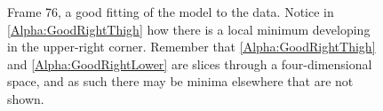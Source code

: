\begin{figure}[p]
	\caption{Frame 76, a good fitting of the model to the data.
		Notice in \ref{Alpha:GoodRightThigh} how there is a local minimum developing in the upper-right corner.
		Remember that \ref{Alpha:GoodRightThigh} and \ref{Alpha:GoodRightLower} are slices through a four-dimensional space,
		and as such there may be minima elsewhere that are not shown.}
	\label{AlphaGood}
\end{figure}

\begin{figure}[p]
	\centering
	\qquad
	\\

\end{figure}
